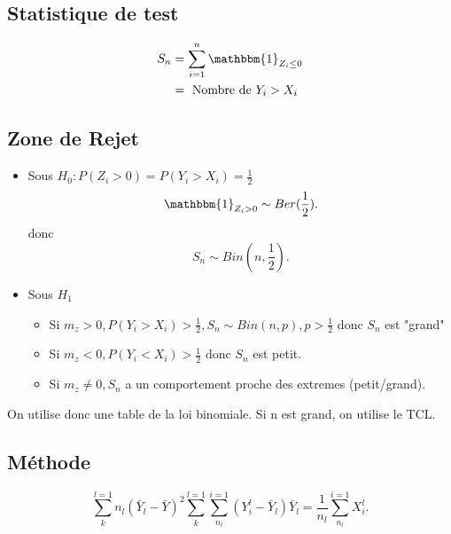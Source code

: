 \documentclass{article}
\theoremstyle{plain}%
\theoremstyle{definition}
\theoremstyle{remark}
\begin{document}
\subsection*{Statistique de test}
\begin{align*}
    S_n &= \sum_{i=1}^{n}\mathbbm{1}_{Z_i \leq 0} \\
    &= \text{ Nombre de } Y_i > X_i
\end{align*}

\subsection*{Zone de Rejet}
\begin{itemize}
    \item Sous $ H_0 : P(Z_i > 0) = P(Y_i > X_i) = \frac{1}{2} $ 
    \[
        \mathbbm{1}_{Z_i > 0} \sim Ber(\frac{1}{2})
    .\]
    donc 
    \[
        S_n \sim Bin(n,\frac{1}{2})
    .\]

    \item Sous $ H_1 $ \begin{itemize}
        \item Si $ m_z > 0, P(Y_i > X_i) > \frac{1}{2}, S_n \sim Bin(n,p), p> \frac{1}{2} $ donc $ S_n $ est "grand"
        \item Si $ m_z < 0, P(Y_i < X_i) > \frac{1}{2} $ donc $ S_n $ est petit.
        \item Si $ m_z \neq  0, S_n $ a un comportement proche des extremes (petit/grand).
    \end{itemize}
\end{itemize}

On utilise donc une table de la loi binomiale. Si n est grand, on utilise le TCL.
\subsection*{Méthode}


\[
    \sum_{k}^{l=1}n_l(\bar{Y}_l - \bar{Y})^2
    \sum_{k}^{l=1}\sum_{n_l}^{i=1}(Y_i^l - \bar{Y}_l)
    \bar{Y}_l = \frac{1}{n_l}\sum_{n_l}^{i=1}X_i^l
.\]
\end{document}

